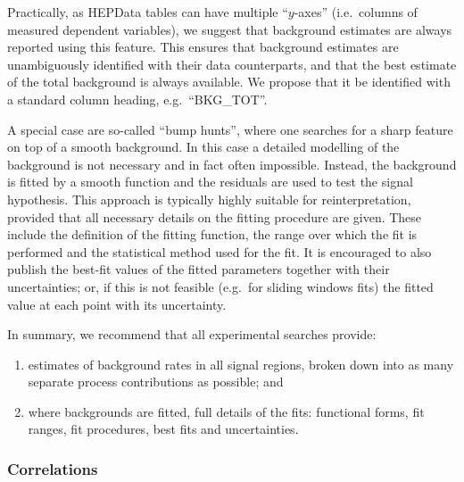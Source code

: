 \documentclass[a4paper,aps,prd,longbibliography,notitlepage,showpacs,amsmath,amssymb,superscriptaddress,nofootinbib,floatfix,11pt,preprintnumbers]{revtex4-1-mod}
\newcommand{\hepdata}{\textsf{HEPData}\xspace}
\newcommand{\ie}{i.e.\xspace}
\newcommand{\eg}{e.g.\xspace}
\begin{document}
Practically, as \hepdata tables can have multiple ``$y$-axes'' (\ie~columns of measured dependent variables), we suggest that background estimates are always reported using this feature. This ensures that background estimates are unambiguously identified with their data counterparts, and that the best estimate of the total background is always available.  We propose that it be identified with a standard column heading, \eg~``\textsf{BKG\_TOT}''.

A special case are so-called ``bump hunts'', where one searches for a sharp feature on top of a smooth background. In this case a detailed modelling of the background is not necessary and in fact often impossible. Instead, the background is fitted by a smooth function and the residuals are used to test the signal hypothesis. This approach is typically highly suitable for reinterpretation, provided that all necessary details on the fitting procedure are given. These include the definition of the fitting function, the range over which the fit is performed and the statistical method used for the fit. It is encouraged to also publish the best-fit values of the fitted parameters together with their uncertainties; or, if this is not feasible (\eg~for sliding windows fits) the fitted value at each point with its uncertainty.

In summary, we recommend that all experimental searches provide:
\begin{enumerate}
\item estimates of background rates in all signal regions, broken down into as many separate process contributions as possible; and
\item where backgrounds are fitted, full details of the fits: functional forms, fit ranges, fit procedures, best fits and uncertainties.
\end{enumerate}

\subsubsection{Correlations}\label{sec:correlations}
\end{document}
